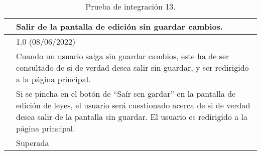 \begin{table}[H]
\begin{center}
\begin{tabular}{|p{3cm}|p{10cm}|} \hline
\centering {\bf PI-13} & Salir de la pantalla de edición sin guardar cambios.  \\ \hline\hline
\centering {\bf Versión} & 1.0 (08/06/2022) \\ \hline
\centering {\bf Descripción} & Cuando un usuario salga sin guardar cambios, este ha de ser consultado de si de verdad desea salir sin guardar, y ser redirigido a la página principal. \\ \hline
\centering {\bf Criterio de aceptación} & Si se pincha en el botón de ``Saír sen gardar'' en la pantalla de edición de leyes, el usuario será cuestionado acerca de si de verdad desea salir de la pantalla sin guardar. El usuario es redirigido a la página principal. \\ \hline
\centering {\bf Estado} & Superada \\ \hline
\end{tabular}
\caption{Prueba de integración 13.}
\label{enlacePI13}
\end{center}
\end{table}